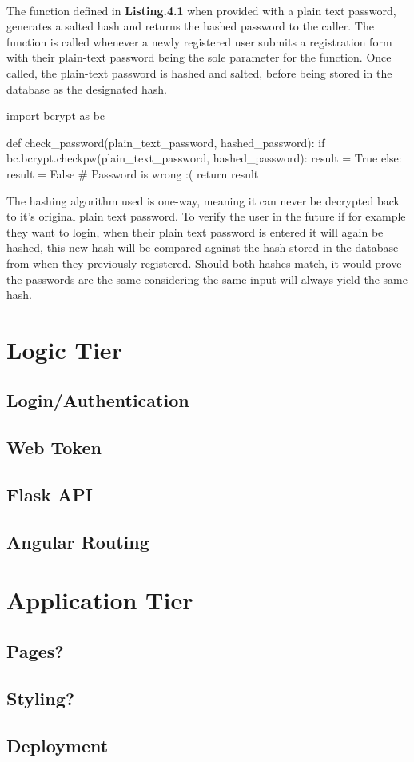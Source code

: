 \paragraph{}
The function defined in \textbf{Listing.4.1} when provided with a plain text password, generates a salted hash and returns the hashed password to the caller. The function is called whenever a newly registered user submits a registration form with their plain-text password being the sole parameter for the function. Once called, the plain-text password is hashed and salted, before being stored in the database as the designated hash. \newline

\begin{python}[caption=Verifing a Password]
import bcrypt as bc

def check_password(plain_text_password, hashed_password):
    if bc.bcrypt.checkpw(plain_text_password, hashed_password):
        result = True
    else:
        result = False # Password is wrong :(
    return result
\end{python}

The hashing algorithm used is one-way, meaning it can never be decrypted back to it's original plain text password. To verify the user in the future if for example they want to login, when their plain text password is entered it will again be hashed, this new hash will be compared against the hash stored in the database from when they previously registered. Should both hashes match, it would prove the passwords are the same considering the same input will always yield the same hash.

\section{Logic Tier}
\subsection{Login/Authentication}
\subsection{Web Token}
\subsection{Flask API}
\subsection{Angular Routing}

\section{Application Tier}
\subsection{Pages?}
\subsection{Styling?}
\subsection{Deployment}